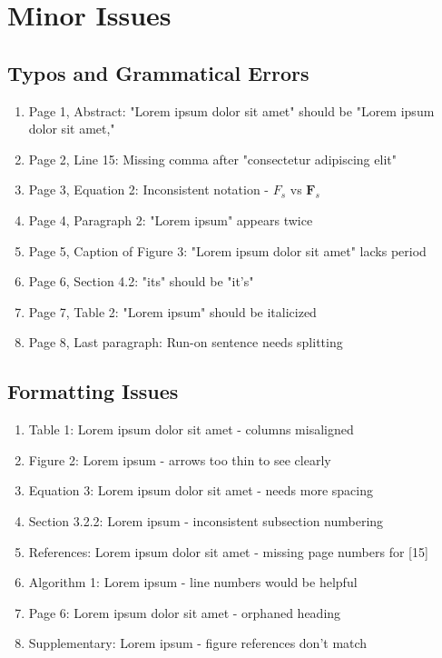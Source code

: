 \section*{Minor Issues}
\label{sec:minor_issues}

\subsection{Typos and Grammatical Errors}
\begin{enumerate}
    \item Page 1, Abstract: "Lorem ipsum dolor sit amet" should be "Lorem ipsum dolor sit amet,"
    \item Page 2, Line 15: Missing comma after "consectetur adipiscing elit"
    \item Page 3, Equation 2: Inconsistent notation - $F_s$ vs $\mathbf{F}_s$
    \item Page 4, Paragraph 2: "Lorem ipsum" appears twice
    \item Page 5, Caption of Figure 3: "Lorem ipsum dolor sit amet" lacks period
    \item Page 6, Section 4.2: "its" should be "it's" 
    \item Page 7, Table 2: "Lorem ipsum" should be italicized
    \item Page 8, Last paragraph: Run-on sentence needs splitting
\end{enumerate}

\subsection{Formatting Issues}
\begin{enumerate}
    \item Table 1: Lorem ipsum dolor sit amet - columns misaligned
    \item Figure 2: Lorem ipsum - arrows too thin to see clearly
    \item Equation 3: Lorem ipsum dolor sit amet - needs more spacing
    \item Section 3.2.2: Lorem ipsum - inconsistent subsection numbering
    \item References: Lorem ipsum dolor sit amet - missing page numbers for [15]
    \item Algorithm 1: Lorem ipsum - line numbers would be helpful
    \item Page 6: Lorem ipsum dolor sit amet - orphaned heading
    \item Supplementary: Lorem ipsum - figure references don't match
\end{enumerate}

